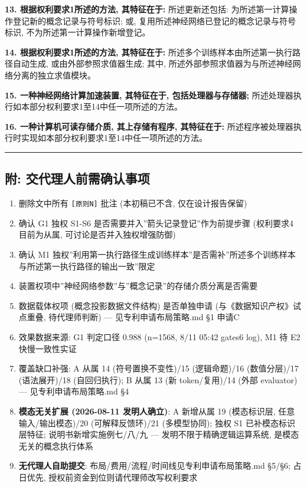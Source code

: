 \documentclass[
]{article}
\providecommand{\tightlist}{%
  \setlength{\itemsep}{0pt}\setlength{\parskip}{0pt}}
\begin{document}
\textbf{13. 根据权利要求1所述的方法, 其特征在于:} 所述更新还包括:
为所述第一计算操作登记新的概念记录与符号标识; 或,
复用所述神经网络已登记的概念记录与符号标识,
不为所述第一计算操作新增登记。

\textbf{14. 根据权利要求1所述的方法, 其特征在于:}
所述多个训练样本由所述第一执行路径自动生成, 或由外部参照求值器生成;
其中, 所述外部参照求值器为与所述神经网络分离的独立求值模块。

\textbf{15. 一种神经网络计算加速装置, 其特征在于, 包括处理器与存储器;}
所述处理器执行如本部分权利要求1至14中任一项所述的方法。

\textbf{16. 一种计算机可读存储介质, 其上存储有程序, 其特征在于:}
所述程序被处理器执行时实现如本部分权利要求1至14中任一项所述的方法。

\begin{center}\rule{0.5\linewidth}{0.5pt}\end{center}

\subsection{附:
交代理人前需确认事项}\label{ux9644-ux4ea4ux4ee3ux7406ux4ebaux524dux9700ux786eux8ba4ux4e8bux9879}

\begin{enumerate}
\def\labelenumi{\arabic{enumi}.}
\tightlist
\item
  删除文中所有 \texttt{{[}原则N{]}} 批注 (本初稿已不含,
  仅在设计报告保留)
\item
  确认 G1 独权 S1-S6 是否需要并入''箭头记录登记''作为前提步骤 (权利要求4
  目前为从属, 可讨论是否并入独权增强防御)
\item
  确认 M1
  独权''利用第一执行路径生成训练样本''是否需补''所述多个训练样本与所述第一执行路径的输出一致''限定
\item
  装置权项中''神经网络参数''与''概念记录''的存储介质分离是否需要
\item
  数据载体权项 (概念投影数据文件结构) 是否单独申请
  (与《数据知识产权》试点重叠, 待代理师判断) --- 见专利申请布局策略.md
  §1 申请C
\item
  效果数据来源: G1 判定口径 0.988 (n=1568, 8/11 05:42 gates6 log), M1 待
  E2 快慢一致性实证
\item
  覆盖缺口补强: A 从属 14 (符号置换不变性)/15 (逻辑命题)/16
  (数值分层)/17 (语法展开)/18 (自回归执行); B 从属 13 (新 token/复用)/14
  (外部 evaluator) --- 见专利申请布局策略.md §4
\item
  \textbf{模态无关扩展 (2026-08-11 发明人确立)}: A 新增从属 19
  (模态标识层, 任意输入/输出模态)/20 (可解释反馈环)/21 (多模型协同);
  独权 S1 已补模态标识层特征; 说明书新增实施例七/八/九 ---
  发明不限于精确逻辑运算系统, 是模态无关的概念执行体系
\item
  \textbf{无代理人自助提交}: 布局/费用/流程/时间线见专利申请布局策略.md
  §5/§6; 占日优先, 授权前资金到位则请代理师改写权利要求
\end{enumerate}
\end{document}
